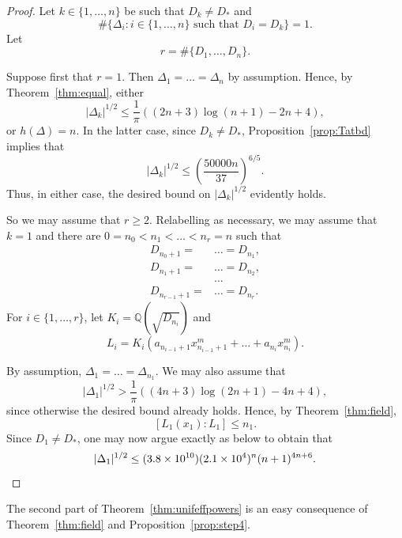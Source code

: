\documentclass[11pt,a4paper, british]{amsart}
\theoremstyle{definition}
\theoremstyle{remark}
\numberwithin{equation}{section}
\newcommand{\Q}{\mathbb{Q}} %
\begin{document}
\begin{proof}
	Let $k \in \{1, \ldots, n\}$ be such that $D_k \neq D_*$ and
	\[ \# \{\Delta_i : i \in \{1, \ldots, n\} \mbox{ such that } D_i = D_k\} = 1.\] 
	Let
	\[ r = \# \{D_1, \ldots, D_n\}.\]
	
	Suppose first that $r=1$. Then $\Delta_1 = \ldots = \Delta_n$ by assumption. Hence, by Theorem~\ref{thm:equal}, either 
	\[ \lvert \Delta_k \rvert^{1/2} \leq \frac{1}{\pi} \left(\left(2n+3\right) \log\left(n+1\right) -2n +4\right),\]
	or $h(\Delta) = n$. In the latter case, since $D_k \neq D_*$, Proposition~\ref{prop:Tatbd} implies that
	\[ \lvert \Delta_k \rvert^{1/2} \leq \left(\frac{50000 n}{37}\right)^{6/5}.\]
	Thus, in either case, the desired bound on $\lvert \Delta_k \rvert^{1/2}$ evidently holds.
	
	So we may assume that $r \geq 2$. Relabelling as necessary, we may assume that $k = 1$ and there are $0 = n_0 < n_1 < \ldots < n_r = n$ such that
	\begin{align*}
		D_{n_0 + 1} = &\ldots = D_{n_1},\\
		D_{n_1 + 1} = &\ldots = D_{n_2},\\
		&\ldots\\
		D_{n_{r-1} + 1} = &\ldots = D_{n_r}.
	\end{align*}
	For $i \in \{1, \ldots, r\}$, let $K_i = \Q(\sqrt{D_{n_i}})$ and
	\[ L_i = K_i(a_{n_{i-1} + 1} x_{n_{i-1} + 1}^m + \ldots + a_{n_i} x_{n_i}^m).\]
	
	By assumption, $\Delta_{1} = \ldots = \Delta_{n_1}$.
	We may also assume that
	\[\lvert \Delta_1 \rvert^{1/2} > \frac{1}{\pi} \left(\left(4n+3\right) \log\left(2n+1\right) -4n + 4\right),\]
	since otherwise the desired bound already holds.
	Hence, by Theorem~\ref{thm:field},
	\[ [L_1(x_1) : L_1] \leq n_1.\]
	Since $D_1 \neq D_*$, one may now argue exactly as below \cite[(39)]{BiluKuhne20} to obtain that
	\[ \lvert \Delta_1 \rvert^{1/2} \leq (3.8 \times 10^{10})(2.1 \times 10^4)^n (n+1)^{4n+6}. \qedhere\]
\end{proof}


The second part of Theorem~\ref{thm:unifeffpowers} is an easy consequence of Theorem~\ref{thm:field} and Proposition~\ref{prop:step4}.
\end{document}
